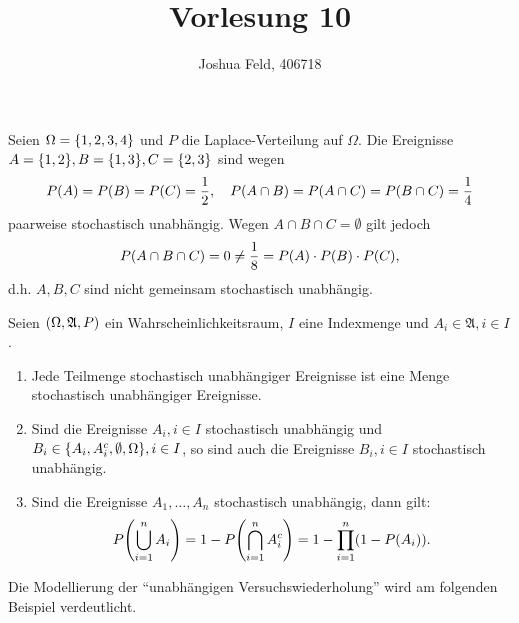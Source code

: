 \documentclass{lecture}
\institute{Institut für Statistik und Wirtschaftsmathematik}
\title{Vorlesung 10}
\author{Joshua Feld, 406718}
\begin{document}
    \maketitle


    \begin{example}
        Seien \(\Omega = \braces*{1, 2, 3, 4}\) und \(P\) die Laplace-Verteilung auf \(\Omega\).
        Die Ereignisse \(A = \braces*{1, 2}, B = \braces*{1, 3}, C = \braces*{2, 3}\) sind wegen
        \[
            P\parentheses*{A} = P\parentheses*{B} = P\parentheses*{C} = \frac{1}{2}, \quad P\parentheses*{A \cap B} = P\parentheses*{A \cap C} = P\parentheses*{B \cap C} = \frac{1}{4}
        \]
        paarweise stochastisch unabhängig.
        Wegen \(A \cap B \cap C = \emptyset\) gilt jedoch
        \[
            P\parentheses*{A \cap B \cap C} = 0 \ne \frac{1}{8} = P\parentheses*{A} \cdot P\parentheses*{B} \cdot P\parentheses* {C},
        \]
        d.h. \(A, B, C\) sind nicht gemeinsam stochastisch unabhängig.
    \end{example}

    \begin{lemma}
        Seien \(\parentheses*{\Omega, \mathfrak{A}, P}\) ein Wahrscheinlichkeitsraum, \(I\) eine Indexmenge und \(A_i \in \mathfrak{A}, i \in I\).
        \begin{enumerate}
            \item Jede Teilmenge stochastisch unabhängiger Ereignisse ist eine Menge stochastisch unabhängiger Ereignisse.
            \item Sind die Ereignisse \(A_i, i \in I\) stochastisch unabhängig und \(B_i \in \braces*{A_i, A_i^c, \emptyset, \Omega}, i \in I\), so sind auch die Ereignisse \(B_i, i \in I\) stochastisch unabhängig.
            \item Sind die Ereignisse \(A_1, \ldots, A_n\) stochastisch unabhängig, dann gilt:
            \[
                P\parentheses*{\bigcup_{i = 1}^n A_i} = 1 - P\parentheses*{\bigcap_{i = 1}^n A_i^c} = 1 - \prod_{i = 1}^n\parentheses*{1 - P\parentheses*{A_i}}.
            \]
        \end{enumerate}
    \end{lemma}

    Die Modellierung der ``unabhängigen Versuchswiederholung'' wird am folgenden Beispiel verdeutlicht.
\end{document}
